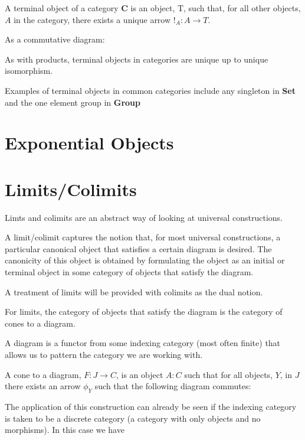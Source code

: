 \documentclass[a4paper,10pt]{article}
\begin{document}
A terminal object of a category \textbf{C} is an object, T, such that, for all
other objects, $A$ in the category, there exists a unique arrow $!_{A}: A
\rightarrow T$.

As a commutative diagram:


As with products, terminal objects in categories are unique up to unique
isomorphism.

Examples of terminal objects in common categories include any singleton in
\textbf{Set} and the one element group in \textbf{Group}

\section{Exponential Objects}
\section{Limits/Colimits}
Limts and colimits are an abstract way of looking at universal constructions.

A limit/colimit captures the notion that, for most universal constructions, a
particular canonical object that satisfies a certain diagram is desired. The
canonicity of this object is obtained by formulating the object as an initial
or terminal object in some category of objects that satisfy the diagram.

A treatment of limits will be provided with colimits as the dual notion.

For limits, the category of objects that satisfy the diagram is the category of
cones to a diagram.

A diagram is a functor from some indexing category (most often finite) that allows
us to pattern the category we are working with.

A cone to a diagram, $F: J \rightarrow C$, is an object $A: C$ such that for
all objects, $Y$, in $J$ there exists an arrow $\phi_{Y}$ such that the
following diagram commutes:


The application of this construction can already be seen if the indexing
category is taken to be a discrete category (a category with only objects and
no morphisms). In this case we have 
\end{document}
